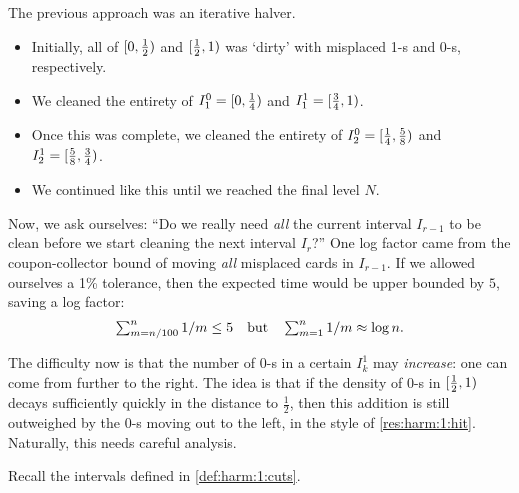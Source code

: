 \documentclass{article}
\begin{document}
\begin{Proof}[Reflection]
\qedtriangle
The previous approach was an iterative halver.
\begin{itemize}
	\item 
	Initially, all of $[0, \tfrac12)$ and $[\tfrac12, 1)$ was `dirty' with misplaced 1-s and 0-s, respectively.
	
	\item 
	We cleaned the entirety of $I_1^0 = [0, \tfrac14)$ and $I_1^1 = [\tfrac34, 1)$.
	
	\item 
	Once this was complete,
	we cleaned the entirety of $I_2^0 = [\tfrac14, \tfrac58)$ and $I_2^1 = [\tfrac58, \tfrac34)$.
	
	\item 
	We continued like this until we reached the final level $N$.
\end{itemize}
Now, we ask ourselves:
	``Do we really need \emph{all} the current interval $I_{r-1}$ to be clean before we start cleaning the next interval $I_r$?''
One log factor came from the coupon-collector bound of moving \emph{all} misplaced cards in $I_{r-1}$.
If we allowed ourselves a 1\% tolerance, then the expected time would be upper bounded by $5$, saving a log factor:
\[
	\sumt{m=n/100}[n]
	1/m
\le
	5
\Quad{but}
	\sumt{m=1}[n]
	1/m
\approx
	\log n.
\]

The difficulty now is that the number of 0-s in a certain $I_k^1$ may \emph{increase}: one can come from further to the right.
The idea is that if the density of 0-s in $[\tfrac12, 1)$ decays sufficiently quickly in the distance to $\tfrac12$, then this addition is still outweighed by the 0-s moving out to the left, in the style of \cref{res:harm:1:hit}.
Naturally, this needs careful analysis.
\end{Proof}

Recall the intervals defined in \cref{def:harm:1:cuts}.
\end{document}
